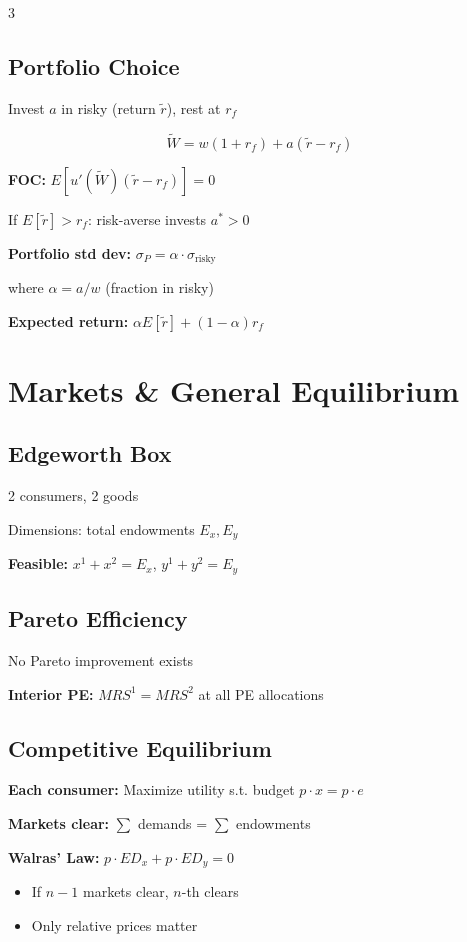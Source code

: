 \documentclass[10pt,landscape]{article}
\begin{document}
\begin{multicols}{3}
\subsection{Portfolio Choice}

Invest $a$ in risky (return $\tilde{r}$), rest at $r_f$

$$\tilde{W} = w(1 + r_f) + a(\tilde{r} - r_f)$$

\textbf{FOC:} $E[u'(\tilde{W})(\tilde{r} - r_f)] = 0$

If $E[\tilde{r}] > r_f$: risk-averse invests $a^* > 0$

\textbf{Portfolio std dev:} $\sigma_P = \alpha \cdot \sigma_{\text{risky}}$

where $\alpha = a/w$ (fraction in risky)

\textbf{Expected return:} $\alpha E[\tilde{r}] + (1-\alpha)r_f$

\section{Markets \& General Equilibrium}

\subsection{Edgeworth Box}
2 consumers, 2 goods

Dimensions: total endowments $E_x, E_y$

\textbf{Feasible:} $x^1 + x^2 = E_x$, $y^1 + y^2 = E_y$

\subsection{Pareto Efficiency}
No Pareto improvement exists

\textbf{Interior PE:} $MRS^1 = MRS^2$ at all PE allocations

\subsection{Competitive Equilibrium}
\textbf{Each consumer:} Maximize utility s.t. budget $p \cdot x = p \cdot e$

\textbf{Markets clear:} $\sum$ demands = $\sum$ endowments

\textbf{Walras' Law:} $p \cdot ED_x + p \cdot ED_y = 0$
\begin{itemize}[leftmargin=*,noitemsep]
\item If $n-1$ markets clear, $n$-th clears
\item Only relative prices matter
\end{itemize}


\end{multicols}
\end{document}
